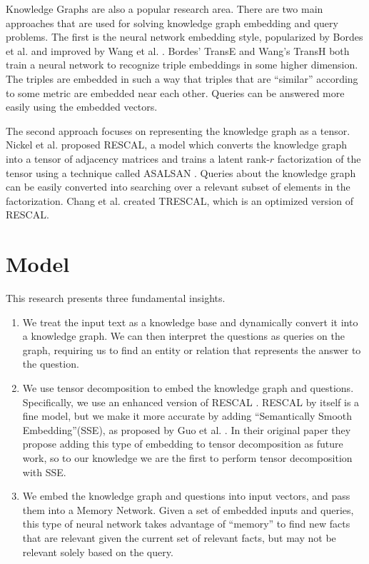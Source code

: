 \documentclass[pageno]{final_paper}
\begin{document}
Knowledge Graphs are also a popular research area. There are two main approaches
that are used for solving knowledge graph embedding and query problems. The
first is the neural network embedding style, popularized by Bordes et al.
\cite{Bordes2013} and improved by Wang et al. \cite{Wang2014}. Bordes' TransE
and Wang's TransH both train a neural network to recognize triple embeddings in
some higher dimension. The triples are embedded in such a way that triples that
are ``similar'' according to some metric are embedded near each other. Queries
can be answered more easily using the embedded vectors.

The second approach focuses on representing the knowledge graph as a tensor.
Nickel et al. \cite{Nickel2011} proposed RESCAL, a model which converts the
knowledge graph into a tensor of adjacency matrices and trains a latent rank-$r$
factorization of the tensor using a technique called ASALSAN \cite{Bader2007}.
Queries about the knowledge graph can be easily converted into searching over a
relevant subset of elements in the factorization. Chang et al. \cite{Chang2014}
created TRESCAL, which is an optimized version of RESCAL.

\section{Model}
\label{Model}

This research presents three fundamental insights. \\

\begin{enumerate}

    \item We treat the input text as a knowledge base and dynamically convert it
    into a knowledge graph. We can then interpret the questions as queries on
    the graph, requiring us to find an entity or relation that represents the
    answer to the question. \\

    \item We use tensor decomposition to embed the knowledge graph and
    questions. Specifically, we use an enhanced version of RESCAL
    \cite{Nickel2011}. RESCAL by itself is a fine model, but we make it more
    accurate by adding ``Semantically Smooth Embedding''(SSE), as proposed by
    Guo et al. \cite{Guo2015}. In their original paper they propose adding this
    type of embedding to tensor decomposition as future work, so to our
    knowledge we are the first to perform tensor decomposition with SSE. \\

    \item We embed the knowledge graph and questions into input vectors, and
    pass them into a Memory Network. Given a set of embedded inputs and queries,
    this type of neural network takes advantage of ``memory'' to find new facts
    that are relevant given the current set of relevant facts, but may not be
    relevant solely based on the query. \\

\end{enumerate}
\end{document}
